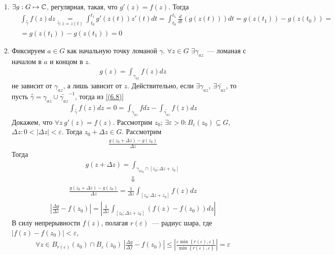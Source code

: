\begin{enumerate}
    \item $\exists g:G \mapsto \mathbb{C}$, регулярная, такая, что $g'(z) = f(z)$.
    Тогда
    \begin{align*}
      & \int_{\overset{\circ}{\gamma}} f(z) dz \underset{\overset{\circ}{\gamma}: z = z(t)}{=} \int_{t_0}^{t_1} g'(z(t))z'(t)dt = \int_{t_0}^{t_1}\frac{d}{dt}(g(z(t)))dt = g(z(t_1)) - g(z(t_0)) = \\
      & = g(z(t_1)) - g(z(t_1)) = 0
    \end{align*}
    \item Фиксируем $a \in G$ как начальную точку ломаной $\gamma$. $\forall z
    \in G$ $\exists \gamma_{az}$~--- ломаная с началом в $a$ и концом в $z$.
    \begin{align*}
      & g(z) = \int_{\gamma_{az}} f(z) dz
    \end{align*}
    не зависит от $\gamma_{az}$, а лишь зависит от $z$. Действительно, если
    $\exists \gamma_{az}, \ \exists \tilde{\gamma_{az}}$, то пусть
    $\overset{\circ}{\gamma} = \gamma_{az} \cup \tilde{\gamma_{az}}^{-1}$,
    тогда из \eqref{(6.8)}
    \begin{align*}
      & \int_{\overset{\circ}{\gamma}} f(z) dz = 0 = \int_{\gamma_{az}}f dz - \int_{\tilde{\gamma_{az}}}f(z)dz
    \end{align*}
    Докажем, что $\forall z \ g'(z) = f(z)$. Рассмотрим $z_0$; $\exists
    \varepsilon > 0: B_{\varepsilon}(z_0) \subseteq G$, $\Delta z: 0 <
    \left| \Delta z \right| < \varepsilon$. Тогда $z_0 + \Delta z \in G$.
    Рассмотрим
    \begin{align*}
      & \frac{g(z_0+\Delta z) - g(z_0)}{\Delta z}
    \end{align*}
    Тогда
    \begin{align*}
      & g(z+ \Delta z) = \int_{\gamma_{az_0} \cap [z_0; \Delta z + z_0]}
    \end{align*}
    \begin{align*}
      & \Downarrow
    \end{align*}
    \begin{align*}
      & \frac{g(z_0+ \Delta z) - g(z_0)}{\Delta z} = \frac{1}{\Delta z} \int_{[z_0; \Delta z + z_0]} f(z)dz
    \end{align*}
    \begin{align*}
      & \left| \frac{\Delta g}{\Delta z} - f(z_0) \right| = \left| \frac{1}{\Delta z} \int_{[z_0; \Delta z + z_0]}(f(z) - f(z_0))dz \right|
    \end{align*}
    В силу непрерывности $f(z)$, полагая $r(\varepsilon)$~--- радиус шара, где
    $\left| f(z) - f(z_0) \right| < \varepsilon$,
    \begin{align*}
      & \forall z \in B_{r(\varepsilon)}(z_0)\cap B_\varepsilon(z_0) \ \left| \frac{\Delta g}{\Delta f} - f(z_0) \right| \leq \left| \frac{\varepsilon\min\left\{ r(\varepsilon), \varepsilon \right\}}{\min\left\{ r(\varepsilon), \varepsilon \right\}} \right| = \varepsilon
    \end{align*}
\end{enumerate}
